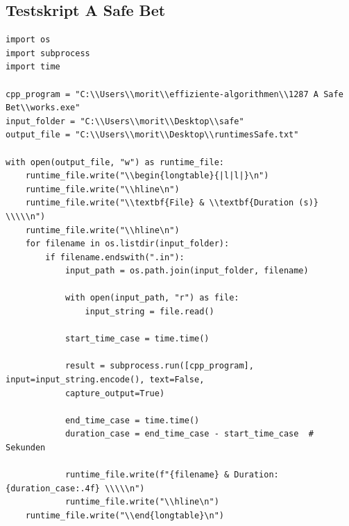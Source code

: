 \subsection{Testskript A Safe Bet}
\label{subsec:TextBefehle}
\begin{verbatim}
import os
import subprocess
import time

cpp_program = "C:\\Users\\morit\\effiziente-algorithmen\\1287 A Safe Bet\\works.exe"
input_folder = "C:\\Users\\morit\\Desktop\\safe"
output_file = "C:\\Users\\morit\\Desktop\\runtimesSafe.txt"

with open(output_file, "w") as runtime_file:
    runtime_file.write("\\begin{longtable}{|l|l|}\n")
    runtime_file.write("\\hline\n")
    runtime_file.write("\\textbf{File} & \\textbf{Duration (s)} \\\\\n")
    runtime_file.write("\\hline\n")
    for filename in os.listdir(input_folder):
        if filename.endswith(".in"):
            input_path = os.path.join(input_folder, filename)

            with open(input_path, "r") as file:
                input_string = file.read()

            start_time_case = time.time()

            result = subprocess.run([cpp_program], input=input_string.encode(), text=False,
            capture_output=True)

            end_time_case = time.time()
            duration_case = end_time_case - start_time_case  # Sekunden

            runtime_file.write(f"{filename} & Duration: {duration_case:.4f} \\\\\n")
            runtime_file.write("\\hline\n")
    runtime_file.write("\\end{longtable}\n")    
\end{verbatim}
%
